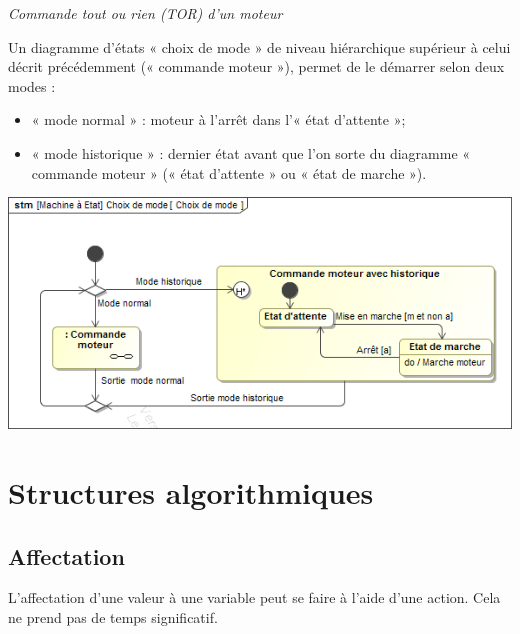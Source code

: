 \documentclass[10pt]{article}
\begin{document}
\begin{exemple}

\textit{Commande tout ou rien (TOR) d’un moteur}

Un diagramme d’états « choix de mode » de niveau hiérarchique supérieur à celui décrit précédemment (« commande moteur »), permet de le démarrer selon deux modes :
\begin{itemize}
\item « mode normal » : moteur à l’arrêt dans l’« état d’attente »;
\item « mode historique » : dernier état avant que l’on sorte du diagramme « commande moteur » (« état d’attente » ou « état de marche »).
\end{itemize}

\begin{center}
\includegraphics[width=.7\textwidth]{images/ChoixMode}
\end{center}
\end{exemple}

\section{Structures algorithmiques}
\subsection{Affectation}
L’affectation d’une valeur à une variable peut se faire à l’aide d’une action. Cela ne prend pas
de temps significatif.
\end{document}
